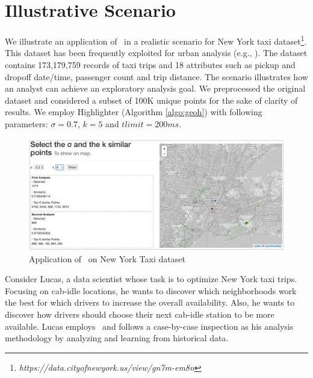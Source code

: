 \section{Illustrative Scenario}\label{sec:scenarios}
We illustrate an application of \framework\ in a realistic scenario for New York taxi dataset\footnote{\it https://data.cityofnewyork.us/view/gn7m-em8n}. This dataset has been frequently exploited for urban analysis
(e.g., \cite{DBLP:journals/debu/FreireCVZ16}).
The dataset contains 173,179,759 records of taxi trips and 18 attributes such as pickup and dropoff date/time, passenger count and trip distance.
The scenario illustrates how an analyst can achieve an exploratory analysis goal. We preprocessed the original dataset and considered a subset of 100K unique points for the sake of clarity of results. We employ {\sc Highlighter} (Algorithm \ref{algo:geoh}) with following parameters: $\sigma = 0.7$, $k = 5$ and $tlimit = 200ms$.

\begin{figure}
  \centering
  \includegraphics[width=\columnwidth]{figs/scenario.png}
\caption{Application of \framework\ on New York Taxi dataset}
\label{fig:app}
\end{figure}

Consider Lucas, a data scientist whose task is to optimize New York taxi trips. Focusing on cab-idle locations, he wants to discover which neighborhoods work the best for which drivers to increase the overall availability. Also, he wants to discover how drivers should choose their next cab-idle station to be more available. Lucas employs \framework\ and follows a case-by-case inspection as his analysis methodology by analyzing and learning from historical data.

